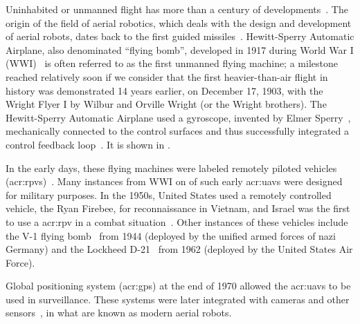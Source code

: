 Uninhabited or unmanned flight has more than a century of developments~\citep{siciliano2016springer}. The origin of the field of aerial robotics, which deals with the design and development of aerial robots, dates back to the first guided missiles~\citep{siciliano2016springer}. Hewitt-Sperry Automatic Airplane, also denominated ``flying bomb'', developed in 1917 during World War I (WWI)~\citep{keane2013brief,valavanis2015handbook} is often referred to as the first unmanned flying machine; a milestone reached relatively soon if we consider that the first heavier-than-air flight in history was demonstrated 14 years earlier, on December 17, 1903, with the Wright Flyer I by Wilbur and Orville Wright (or the Wright brothers). The Hewitt-Sperry Automatic Airplane used a gyroscope, invented by Elmer Sperry~\citep{keane2013brief}, mechanically connected to the control surfaces and thus successfully integrated a control feedback loop~\citep{siciliano2016springer}. It is shown in .

In the early days, these flying machines were labeled remotely piloted vehicles (\Gls{acr:rpv}s)~\citep{anderson2005introduction}. Many instances from WWI on of such early \Gls{acr:uav}s were designed for military purposes. In the 1950s, United States used a remotely controlled vehicle, the Ryan Firebee, for reconnaissance in Vietnam, and Israel was the first to use a \Gls{acr:rpv} in a combat situation~\citep{anderson2005introduction}. Other instances of these vehicles include the V-1 flying bomb~ from 1944 (deployed by the unified armed forces of nazi Germany) and the Lockheed D-21~ from 1962 (deployed by the United States Air Force).

Global positioning system (\Gls{acr:gps}) at the end of 1970 allowed the \Gls{acr:uav}s to be used in surveillance. These systems were later integrated with cameras and other sensors~\citep{siciliano2016springer}, in what are known as modern aerial robots.

